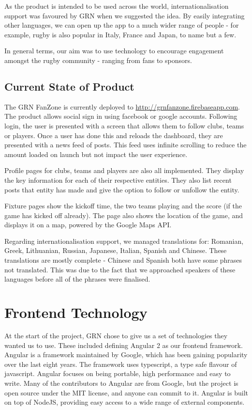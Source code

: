 \documentclass{l3proj}
\begin{document}
As the product is intended to be used across the world, internationalisation
 support was favoured by GRN when we suggested the idea. By easily integrating
 other languages, we can open up the app to a much wider range of people - for
 example, rugby is also popular in Italy, France and Japan, to name but a few.

In general terms, our aim was to use technology to encourage engagement amongst the
 rugby community - ranging from fans to sponsors.

\subsection{Current State of Product}
The GRN FanZone is currently deployed to \url{http://grnfanzone.firebaseapp.com}.
 The product allows social sign in using facebook or google accounts. Following
 login, the user is presented with a screen that allows them to follow clubs,
 teams or players. Once a user has done this and reloads the dashboard, they
 are presented with a news feed of posts. This feed uses infinite scrolling to 
 reduce the amount loaded on launch but not impact the user experience.
 
Profile pages for clubs, teams and players are also all implemented. They display
 the key information for each of their respective entities. They also list 
 recent posts that entity has made and give the option to follow or unfollow 
 the entity.
 
Fixture pages show the kickoff time, the two teams playing and the score (if the
 game has kicked off already). The page also shows the location of the game,
 and displays it on a map, powered by the Google Maps API.
 
Regarding internationalisation support, we managed translations for: Romanian,
 Greek, Lithuanian, Russian, Japanese, Italian, Spanish and Chinese. These 
 translations are mostly complete - Chinese and Spanish both have some phrases
 not translated. This was due to the fact that we approached speakers of these 
 languages before all of the phrases were finalised. 


\section{Frontend Technology} %
\label{sec:frontend}

At the start of the project, GRN chose to give us a set of technologies they
 wanted us to use. These included defining Angular 2 as our frontend framework.
 Angular is a framework maintained by Google, which has been gaining popularity
 over the last eight years\cite{angularjsoverview}. The framework uses typescript,
 a type safe flavour of javascript. Angular focuses on being portable, high performance
 and easy to write\cite{angular_features}. Many of the contributors to Angular are
 from Google, but the project is open source under the MIT license, and anyone can
 commit to it\cite{angularjsoverview}. Angular is built on top of NodeJS, providing
 easy access to a wide range of external components.
\end{document}
